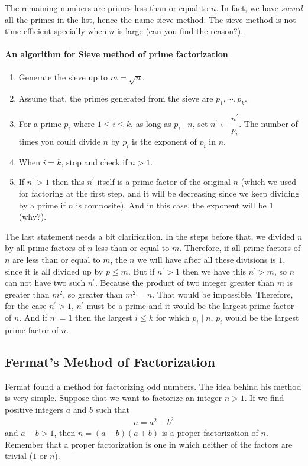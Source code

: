 The remaining numbers are primes less than or equal to $n$. In fact, we have \emph{sieved} all the primes in the list, hence the name sieve method. The sieve method is not time efficient specially when $n$ is large (can you find the reason?).
\paragraph{An algorithm for Sieve method of prime factorization}
	\begin{enumerate}[1.]
		\item Generate the sieve up to $m=\sqrt{n}$.
		\item Assume that, the primes generated from the sieve are $p_1,\cdots,p_k$.
		\item For a prime $p_i$ where $1\leq i\leq k$, as long as $p_i\mid n$, set $n^\prime\longleftarrow\dfrac{n^\prime}{p_i}$. The number of times you could divide $n$ by $p_i$ is the exponent of $p_i$ in $n$.
		\item When $i=k$, stop and check if $n>1$.
		\item If $n^\prime>1$ then this $n^\prime$ itself is a prime factor of the original $n$ (which we used for factoring at the first step, and it will be decreasing since we keep dividing by a prime if $n$ is composite). And in this case, the exponent will be $1$ (why?).
	\end{enumerate}
The last statement needs a bit clarification. In the steps before that, we divided $n$ by all prime factors of $n$ less than or equal to $m$. Therefore, if all prime factors of $n$ are less than or equal to $m$, the $n$ we will have after all these divisions is $1$, since it is all divided up by $p\leq m$. But if $n^\prime>1$ then we have this $n^\prime>m$, so $n$ can not have two such $n^\prime$. Because the product of two integer greater than $m$ is greater than $m^2$, so greater than $m^2=n$. That would be impossible. Therefore, for the case $n^\prime>1$, $n^\prime$ must be a prime and it would be the largest prime factor of $n$. And if $n^\prime=1$ then the largest $i\leq k$ for which $p_i\mid n$, $p_i$ would be the largest prime factor of $n$.
\subsection{Fermat's Method of Factorization}
Fermat found a method for factorizing odd numbers. The idea behind his method is very simple. Suppose that we want to factorize an integer $n>1$. If we find positive integers $a$ and $b$ such that
	\begin{align*}
		n=a^2-b^2
	\end{align*}
and $a-b >1$, then $n=(a-b)(a+b)$ is a proper factorization of $n$. Remember that a proper factorization is one in which neither of the factors are trivial ($1$ or $n$).

